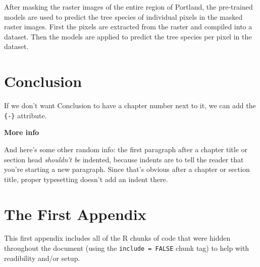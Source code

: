 \documentclass[12pt,twoside]{reedthesis}
\begin{document}
After masking the raster images of the entire region of Portland, the pre-trained models are used to predict the tree species of individual pixels in the masked raster images. First the pixels are extracted from the raster and compiled into a dataset. Then the models are applied to predict the tree species per pixel in the dataset.

\hypertarget{conclusion}{%
\chapter*{Conclusion}\label{conclusion}}

If we don't want Conclusion to have a chapter number next to it, we can add the \texttt{\{-\}} attribute.

\textbf{More info}

And here's some other random info: the first paragraph after a chapter title or section head \emph{shouldn't be} indented, because indents are to tell the reader that you're starting a new paragraph. Since that's obvious after a chapter or section title, proper typesetting doesn't add an indent there.

\appendix

\hypertarget{the-first-appendix}{%
\chapter{The First Appendix}\label{the-first-appendix}}

This first appendix includes all of the R chunks of code that were hidden throughout the document (using the \texttt{include\ =\ FALSE} chunk tag) to help with readibility and/or setup.
\end{document}
